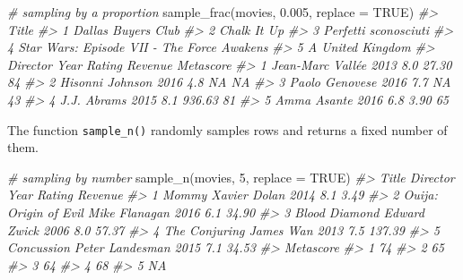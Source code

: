 \documentclass[
]{book}
\newenvironment{Shaded}{\begin{snugshade}}{\end{snugshade}}
\newcommand{\AttributeTok}[1]{\textcolor[rgb]{0.77,0.63,0.00}{#1}}
\newcommand{\CommentTok}[1]{\textcolor[rgb]{0.56,0.35,0.01}{\textit{#1}}}
\newcommand{\ConstantTok}[1]{\textcolor[rgb]{0.00,0.00,0.00}{#1}}
\newcommand{\DecValTok}[1]{\textcolor[rgb]{0.00,0.00,0.81}{#1}}
\newcommand{\FloatTok}[1]{\textcolor[rgb]{0.00,0.00,0.81}{#1}}
\newcommand{\FunctionTok}[1]{\textcolor[rgb]{0.00,0.00,0.00}{#1}}
\newcommand{\NormalTok}[1]{#1}
\begin{document}
\begin{Shaded}
\begin{Highlighting}[]
\CommentTok{\# sampling by a proportion}
\FunctionTok{sample\_frac}\NormalTok{(movies, }\FloatTok{0.005}\NormalTok{, }\AttributeTok{replace =} \ConstantTok{TRUE}\NormalTok{)}
\CommentTok{\#\textgreater{}                                        Title}
\CommentTok{\#\textgreater{} 1                         Dallas Buyers Club}
\CommentTok{\#\textgreater{} 2                                Chalk It Up}
\CommentTok{\#\textgreater{} 3                       Perfetti sconosciuti}
\CommentTok{\#\textgreater{} 4 Star Wars: Episode VII {-} The Force Awakens}
\CommentTok{\#\textgreater{} 5                           A United Kingdom}
\CommentTok{\#\textgreater{}           Director Year Rating Revenue Metascore}
\CommentTok{\#\textgreater{} 1 Jean{-}Marc Vallée 2013    8.0   27.30        84}
\CommentTok{\#\textgreater{} 2  Hisonni Johnson 2016    4.8      NA        NA}
\CommentTok{\#\textgreater{} 3   Paolo Genovese 2016    7.7      NA        43}
\CommentTok{\#\textgreater{} 4      J.J. Abrams 2015    8.1  936.63        81}
\CommentTok{\#\textgreater{} 5      Amma Asante 2016    6.8    3.90        65}
\end{Highlighting}
\end{Shaded}

The function \texttt{sample\_n()} randomly samples rows and returns a fixed number of them.

\begin{Shaded}
\begin{Highlighting}[]
\CommentTok{\# sampling by number}
\FunctionTok{sample\_n}\NormalTok{(movies, }\DecValTok{5}\NormalTok{, }\AttributeTok{replace =} \ConstantTok{TRUE}\NormalTok{)}
\CommentTok{\#\textgreater{}                   Title        Director Year Rating Revenue}
\CommentTok{\#\textgreater{} 1                 Mommy    Xavier Dolan 2014    8.1    3.49}
\CommentTok{\#\textgreater{} 2 Ouija: Origin of Evil   Mike Flanagan 2016    6.1   34.90}
\CommentTok{\#\textgreater{} 3         Blood Diamond    Edward Zwick 2006    8.0   57.37}
\CommentTok{\#\textgreater{} 4         The Conjuring       James Wan 2013    7.5  137.39}
\CommentTok{\#\textgreater{} 5            Concussion Peter Landesman 2015    7.1   34.53}
\CommentTok{\#\textgreater{}   Metascore}
\CommentTok{\#\textgreater{} 1        74}
\CommentTok{\#\textgreater{} 2        65}
\CommentTok{\#\textgreater{} 3        64}
\CommentTok{\#\textgreater{} 4        68}
\CommentTok{\#\textgreater{} 5        NA}
\end{Highlighting}
\end{Shaded}
\end{document}
